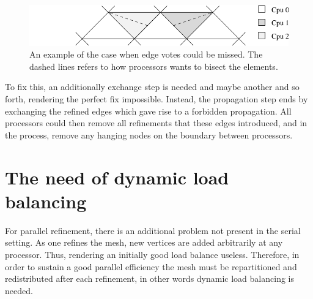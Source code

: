 \begin{figure}[htb]
  \begin{center}
   \includegraphics[width=0.65\columnwidth]{chapters/hoffman-4/pdf/probmissing.pdf}
  \end{center}
   \caption{An example of the case when edge votes could be missed. The dashed lines refers to how processors wants to bisect the elements.}
   \label{hoffman-4:fig:probmissing}

\end{figure}

To fix this, an additionally exchange step is needed and maybe another
and so forth, rendering the perfect fix impossible. Instead, the
propagation step ends by exchanging the refined edges which gave rise
to a forbidden propagation. All processors could then remove all
refinements that these edges introduced, and in the process, remove
any hanging nodes on the boundary between processors.

\section{The need of dynamic load balancing}

For parallel refinement, there is an additional problem not present in
the serial setting. As one refines the mesh, new vertices are added
arbitrarily at any processor. Thus, rendering an initially good load
balance useless. Therefore, in order to sustain a good parallel
efficiency the mesh must be repartitioned and redistributed after each
refinement, in other words dynamic load balancing is needed.

